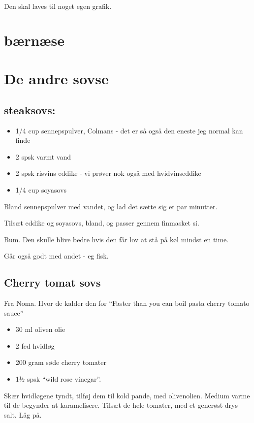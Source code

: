 \documentclass[
]{book}
\providecommand{\tightlist}{%
  \setlength{\itemsep}{0pt}\setlength{\parskip}{0pt}}
\begin{document}
Den skal laves til noget egen grafik.

\section{bærnæse}\label{buxe6rnuxe6se}

\section{De andre sovse}\label{de-andre-sovse}

\subsection{steaksovs:}\label{steaksovs}

\begin{itemize}
\tightlist
\item
  1/4 cup sennepspulver, Colmans - det er så også den eneste jeg normal kan finde
\item
  2 spsk varmt vand
\item
  2 spsk risvins eddike - vi prøver nok også med hvidvinseddike
\item
  1/4 cup soyasovs
\end{itemize}

Bland sennepspulver med vandet, og lad det sætte sig et par minutter.

Tilsæt eddike og soyasovs, bland, og passer gennem finmasket si.

Bum. Den skulle blive bedre hvis den får lov at stå på køl mindst en time.

Går også godt med andet - eg fisk.

\subsection{Cherry tomat sovs}\label{cherry-tomat-sovs}

Fra Noma. Hvor de kalder den for ``Faster than you can boil pasta cherry tomato sauce''

\begin{itemize}
\tightlist
\item
  30 ml oliven olie
\item
  2 fed hvidløg
\item
  200 gram søde cherry tomater
\item
  1½ spsk ``wild rose vinegar''.
\end{itemize}

Skær hvidløgene tyndt, tilføj dem til kold pande, med olivenolien.
Medium varme til de begynder at karamelisere.
Tilsæt de hele tomater, med et generøst drys salt. Låg på.
\end{document}

